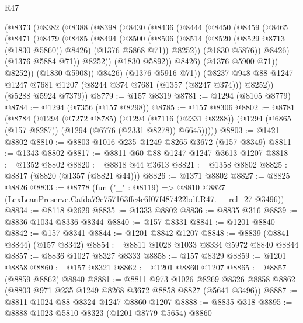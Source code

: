 \begin{lexlean}{R47}
\begin{coremodule}
      (@8373
        (@8382
          (@8388
            (@8398
              (@8430
                (@8436
                  (@8444
                    (@8450
                      (@8459
                        (@8465
                          (@8471
                            (@8479
                              (@8485
                                (@8494
                                  (@8500
                                    (@8506
                                      (@8514
                                        (@8520 (@8529 @8713 (@1830 @5860)) @8426)
                                        (@1376 @5868 @71))
                                      @8252))
                                  (@1830 @5876))
                                @8426)
                              (@1376 @5884 @71))
                            @8252))
                        (@1830 @5892))
                      @8426)
                    (@1376 @5900 @71))
                  @8252))
              (@1830 @5908))
            @8426)
          (@1376 @5916 @71))
        (@8237 @948 @88 @1247 @1247 @7681 @1207 (@8244 @374 @7681 (@1357 (@8247 @374))) @8252))
      (@5288 @5924 @7379))
@8779 := @157 @8319
@8781 := @1294 (@8105 @8779)
@8784 := @1294 (@7356 (@157 @8298))
@8785 := @157 @8306
@8802 := @8781
    (@8784
      (@1294
        (@7272 @8785)
        (@1294
          (@7116 (@2331 @8288))
          (@1294 (@6865 (@157 @8287)) (@1294 (@6776 (@2331 @8278)) @6645)))))
@8803 := @1421 @8802
@8810 := @8803 @1016 @235 @1249 @8265 @3672 (@157 @8349)
@8811 := @1343 @8802
@8817 := @8811 @60 @88 @1247 @1247 @3613 @1207
@8818 := @1352 @8802
@8820 := @8818 @44 @3613
@8821 := @1358 @8802
@8825 := @8817 (@8820 (@1357 (@8821 @44)))
@8826 := @1371 @8802
@8827 := @8825 @8826
@8833 := @8778
    (fun ("_" : @8119) =>
    @8810 @8827 (LexLeanPreserve.Cafda79c757163ffe4c6f07f487422bdf.R47.__rel_27 @3496))
@8834 := @8118 @2629
@8835 := @1333 @8802
@8836 := @8835 @316
@8839 := @8836 @1034 @8336 @8344
@8840 := @157 @8331
@8841 := @1201 @8840
@8842 := @157 @8341
@8844 := @1201 @8842 @1207
@8848 := @8839 (@8841 @8844) (@157 @8342)
@8854 := @8811 @1028 @1033 @8334 @5972 @8840 @8844
@8857 := @8836 @1027 @8327 @8333
@8858 := @157 @8329
@8859 := @1201 @8858
@8860 := @157 @8321
@8862 := @1201 @8860 @1207
@8865 := @8857 (@8859 @8862) @8840
@8881 := @8811
    @973
    @1026
    @8269
    @8326
    @8858
    @8862
    (@8803 @971 @235 @1249 @8268 @3672 @8858 @8827 (@5641 @3496))
@8887 := @8811 @1024 @88 @8324 @1247 @8860 @1207
@8888 := @8835 @318
@8895 := @8888 @1023 @5810 @8323 (@1201 @8779 @5654) @8860

\end{coremodule}
\end{lexlean}
